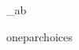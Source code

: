 \Theta  \omega  \Omega  \log_{a}b


oneparchoices

\fillin[]

\begin{comment}


\begin{questyle}
  \question  zzz  (GATE-zzz)

  \begin{choices}
    \choice         zzz
    \choice         zzz
    \choice         zzz
    \choice         zzz
    \CorrectChoice
  \end{choices}
\end{questyle}

\begin{questyle}
  \question  zzz  (GATE-zzz)

  \begin{choices}
    \choice         zzz
    \choice         zzz
    \choice         zzz
    \choice         zzz
    \CorrectChoice
  \end{choices}
\end{questyle}

\begin{questyle}
  \question  zzz  (GATE-zzz)

  \begin{choices}
    \choice         zzz
    \choice         zzz
    \choice         zzz
    \choice         zzz
    \CorrectChoice
  \end{choices}
\end{questyle}

\begin{questyle}
  \question  zzz  (GATE-zzz)

  \begin{choices}
    \choice         zzz
    \choice         zzz
    \choice         zzz
    \choice         zzz
    \CorrectChoice
  \end{choices}
\end{questyle}

\begin{questyle}
  \question  zzz  (GATE-zzz)

  \begin{choices}
    \choice         zzz
    \choice         zzz
    \choice         zzz
    \choice         zzz
    \CorrectChoice
  \end{choices}
\end{questyle}

\begin{questyle}
  \question  zzz  (GATE-zzz)


\end{comment}
